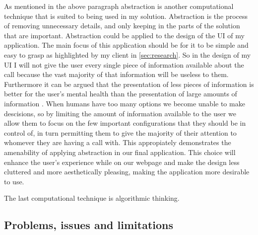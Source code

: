 As mentioned in the above paragraph abstraction is another 
computational technique that is suited to being used in my 
solution. Abstraction is the process of removing unnecessary
details, and only keeping in the parts of the solution that are
important. Abstraction could be applied to the design of the 
UI of my application. The main focus of this application should
be for it to be simple and easy to grasp as highlighted by my 
client in \ref{sec:research}. So in the design of my UI I will 
not give the user every single piece of information available
about the call because the vast majority of that information 
will be useless to them. Furthermore it can be argued that the 
presentation of less pieces of information is better for the 
user's mental health than the presentation of large amounts of 
information \cite{overchoice}. When humans have too many 
options we become unable to make descisions, so by limiting the
amount of information available to the user we allow them to 
focus on the few important configurations that they should be 
in control of, in turn permitting them to give the majority of
their attention to whomever they are having a call with. This 
appropiately demonstrates the amenability of applying
abstraction in our final application. This choice will enhance
the user's experience while on our webpage and make the design
less cluttered and more aesthetically pleasing, making the 
application more desirable to use.  \vspace{0.2cm}

The last computational technique is algorithmic thinking.

\subsection{Problems, issues and limitations}

\textbf{}
